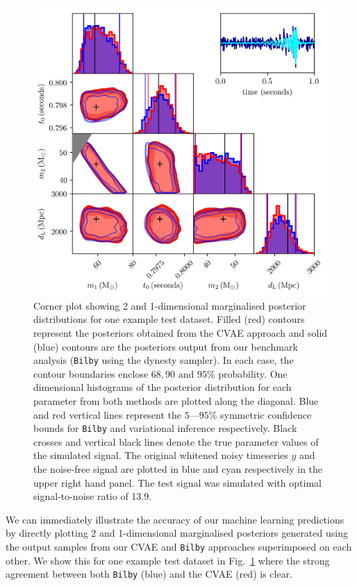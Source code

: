 \documentclass[%
showpacs,
 amsmath,amssymb,
 aps,
 twocolumn,
 prl,
 reprint,
floatfix,
]{revtex4-1}
\begin{document}
%
%
\begin{figure}
    \includegraphics[width=\textwidth]{images/corner_testcase0.png}
    \caption{\label{fig:corner_plot} Corner plot showing 2 and 1-dimensional
marginalised posterior distributions for one example test dataset. Filled (red)
contours represent the posteriors obtained from the \ac{CVAE} approach and
solid (blue) contours are the posteriors output from our benchmark analysis
(\texttt{Bilby} using the dynesty sampler). In each case, the contour boundaries
enclose $68,90$ and $95\%$ probability. One dimensional histograms of the
posterior distribution for each parameter from both methods are plotted along
the diagonal. Blue and red vertical lines represent the $5$---$95\%$ symmetric
confidence bounds for \texttt{Bilby} and variational inference respectively.
Black crosses and vertical black lines denote the true parameter values of the
simulated signal. The original whitened noisy timeseries $y$ and the noise-free
signal are plotted in blue and cyan respectively in the upper right hand
panel. The test signal was simulated with optimal signal-to-noise ratio of
13.9.}
\end{figure}

%
%
We can immediately illustrate the accuracy of our machine learning predictions
by directly plotting 2 and 1-dimensional marginalised posteriors generated
using the output samples from our \ac{CVAE} and \texttt{Bilby} approaches
superimposed on each other. We show this for one example test dataset in
Fig.~\ref{fig:corner_plot} where the strong agreement between both
\texttt{Bilby} (blue) and the \ac{CVAE} (red) is clear. 
\end{document}
